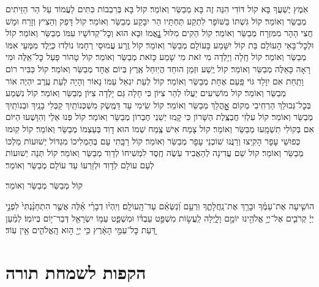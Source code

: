 \documentclass[twoside, openany, parskip=half, 11pt]{book}
\begin{document}
\begin{small}
אֹֽמֶץ יֶשְׁעֲךָ בָּא קוֹל דּוֹדִי הִנֵּה זֶה בָּא מְבַשֵּׂר וְאוֹמֵר׃
קוֹל בָּא בְּרִבְבוֹת כִּתִּים לַעֲמוֹד עַל הַר הַזֵּיתִים מְבַשֵּׂר וְאוֹמֵר׃
קוֹל גִּשְׁתּוֹ בַּשּׁוֹפָר לִתְקַע תַּחְתָּיו הַר יִבָּקַע מְבַשֵּׂר וְאוֹמֵר׃
קוֹל דָּפַק וְהֵצִיץ וְזָרַח וּמָשׁ חֲצִי הָהָר מִמִּזְרָח מְבַשֵּׂר וְאוֹמֵר׃
קוֹל הֵקִים מִלּוּל נׇׇׇׇאֳמוֹ וּבָא הוּא וְכׇל־קְדוֹשָׁיו עִמּוֹ מְבַשֵּׂר וְאוֹמֵר׃
קוֹל וּלְכׇל־בָּאֵי הָעוֹלָם בַּת קוֹל יִשָּׁמַע בָּעוֹלָם מְבַשֵּׂר וְאוֹמֵר׃
קוֹל זֶֽרַע עֲמוּסֵי רְחָמוֹ נוֹלְדוּ כְּיֶֽלֶד מִמְּעֵי אִמּוֹ מְבַשֵּׂר וְאוֹמֵר׃
קוֹל חָֽלָה וְיָלְדָה מִי זֹאת מִי שָׁמַע כָּזֹאת מְבַשֵּׂר וְאוֹמֵר׃
קוֹל טָהוֹר פָּעַל כׇּל־אֵֽלֶּה וּמִי רָאָה כָּאֵלֶּה מְבַשֵּׂר וְאוֹמֵר׃
קוֹל יֶֽשַׁע וּזְמַן הוּחַד הֲיֽוּחַל אֶֽרֶץ בְּיוֹם אֶחָד מְבַשֵּׂר וְאוֹמֵר׃
קוֹל כַּבִּיר רוֹם וָתַֽחַת אִם יִוָּלֵד גּוֹי פַּֽעַם אֶחָת מְבַשֵּׂר וְאוֹמֵר׃
קוֹל לְעֵת יִגְאַל עַמּוֹ נָאוֹר וְהָיָה לְעֵת עֶֽרֶב יִהְיֶה אוֹר מְבַשֵּׂר וְאוֹמֵר׃
קוֹל מוֹשִׁיעִים יַעֲלוּ לְהַר צִיּוֹן כִּי חָלָה גַּם יָלְדָה צִיּוֹן מְבַשֵּׂר וְאוֹמֵר׃
קוֹל נִשְׁמַע בְּכׇל־גְּבוּלֵךְ הַרְחִֽיבִי מְקוֹם אׇׇׇׇׇׇהֳלֵךְ מְבַשֵּׂר וְאוֹמֵר׃
קוֹל שִֽׂימִי עַד דַּמֶּֽשֶׂק מִשְׁכְּנוֹתַֽיִךְ קַבְּלִי בָנַֽיִךְ וּבְנוֹתַֽיִךְ מְבַשֵּׂר וְאוֹמֵר׃
קוֹל עִלְזִי חֲבַצֶּֽלֶת הַשָּׁרוֹן כִּי קָֽמוּ יְשֵׁנֵי חֶבְרוֹן מְבַשֵּׂר וְאוֹמֵר׃
קוֹל פְּנוּ אֵלַי וְהִוָּשְׁעוּ הַיּוֹם אִם בְּקוֹלִי תִשְׁמָֽעוּ מְבַשֵּׂר וְאוֹמֵר׃
קוֹל צָמַח אִישׁ צֶֽמַח שְׁמוֹ הוּא דָוִד בְּעַצְמוֹ מְבַשֵּׂר וְאוֹמֵר׃
קוֹל קֽוּמוּ כְּפוּשֵׁי עָפָר הָקִֽיצוּ וְרַנֲּנוּ שׁוֹכְנֵי עָפָר מְבַשֵּׂר וְאוֹמֵר׃
קוֹל רַבָּֽתִי עָם בְּהַמְלִיכוֹ מִגְדּוֹל יְשׁוּעוֹת מַלְכּוֹ מְבַשֵּׂר וְאוֹמֵר׃
קוֹל שֵׁם עֲדִינָה לְהַאֲבִיד עֹֽשֶׂה חֶֽסֶד לִמְשִׁיחוֹ לְדָוִד מְבַשֵּׂר וְאוֹמֵר׃
קוֹל תְּנָה יְשׁוּעוֹת לְעַם עוֹלָם לְדָוִד וּלְזַרְעוֹ עַד עוֹלָם מְבַשֵּׂר וְאוֹמֵר׃

\end{small}

\begin{large}
קוֹל מְבַשֵּׂר מְבַשֵּׂר וְאוֹמֵר׃

\end{large}

הוֹשִׁ֤יעָה אֶת־עַמֶּ֗ךָ וּבָרֵ֥ךְ אֶת־נַֽחֲלָתֶ֑ךָ וּֽרְעֵ֥ם וְ֝נַשְּׂאֵ֗ם עַד־הָֽעוֹלָֽם׃ וְיִֽהְי֨וּ דְבָרַ֜י אֵ֗לֶּה אֲשֶׁ֤ר הִתְחַנַּ֨נְתִּי֙ לִפְנֵ֣י יְיָ֔ קְרֹבִ֛ים אֶל־יְיָ֥ אֱלֹהֵ֖ינוּ יוֹמָ֣ם וָלָ֑יְלָה לַֽעֲשׂ֣וֹת מִשְׁפַּ֣ט עַבְדּ֗וֹ וּמִשְׁפַּ֛ט עַמּ֥וֹ יִשְׂרָאֵ֖ל דְּבַר־י֥וֹם בְּיוֹמֽוֹ׃ לְמַ֗עַן דַּ֚עַת כׇּל־עַמֵּ֣י הָאָ֔רֶץ כִּ֥י יְיָ֖ ה֣וּא הָֽאֱלֹהִ֑ים אֵ֖ין עֽוֹד׃


\chapter[הקפות לשמחת תורה]{ הקפות לשמחת תורה }
\end{document}
